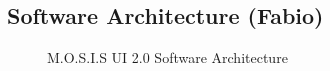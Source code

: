 \subsection{Software Architecture (Fabio)}
\begin{figure}[H]
	\caption{M.O.S.I.S UI 2.0 Software Architecture}
\end{figure}
